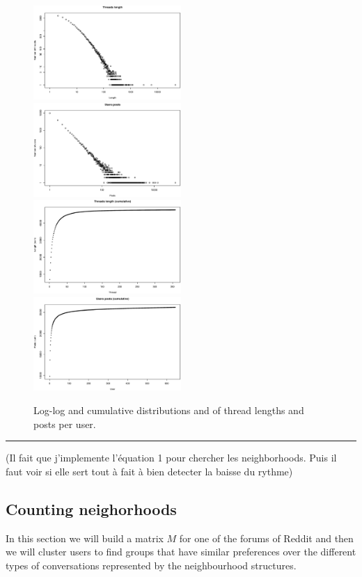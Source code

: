 \documentclass[smallextended]{svjour3}          %
\begin{document}
\begin{figure}
\centering
\includegraphics[width=0.5\textwidth]{threads_length}%
\includegraphics[width=0.5\textwidth]{users_posts}
\includegraphics[width=0.5\textwidth]{threads_length_cum}%
\includegraphics[width=0.5\textwidth]{users_posts_cum}
\caption{Log-log and cumulative distributions and of thread lengths and posts per user.}
\label{fig:podemos_distributions}
\end{figure}

    \noindent\textcolor{red}{\rule{16cm}{1mm}}
(Il fait que j'implemente l'équation 1 pour chercher les neighborhoods. Puis il faut voir si elle sert tout à fait à bien detecter la baisse du rythme)
\subsection{Counting neighorhoods}
In this section we will build a matrix $M$ for one of the forums of Reddit and then we will cluster users to find groups that have similar preferences over the different types of conversations represented by the neighbourhood structures. 
\end{document}
